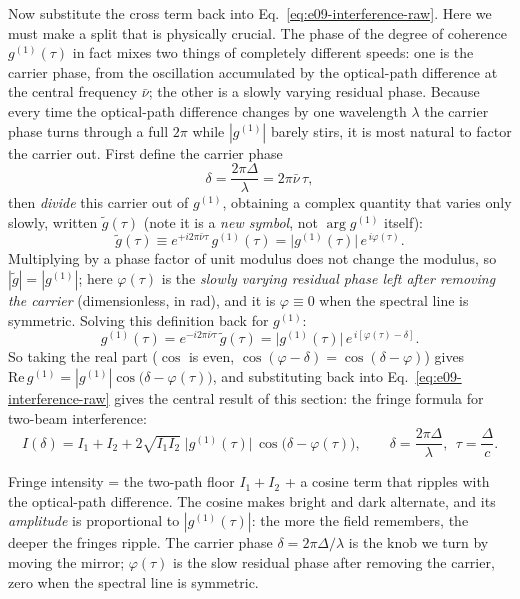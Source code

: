 Now substitute the cross term back into Eq.~\eqref{eq:e09-interference-raw}. Here we must make a split that is physically crucial. The phase of the degree of coherence \(g^{(1)}(\tau)\) in fact mixes two things of completely different speeds: one is the carrier phase, from the oscillation accumulated by the optical-path difference at the central frequency \(\bar\nu\); the other is a slowly varying residual phase. Because every time the optical-path difference changes by one wavelength \(\lambda\) the carrier phase turns through a full \(2\pi\) while \(|g^{(1)}|\) barely stirs, it is most natural to factor the carrier out. First define the carrier phase
\[
  \delta=\frac{2\pi\Delta}{\lambda}=2\pi\bar\nu\,\tau ,
\]
then \emph{divide} this carrier out of \(g^{(1)}\), obtaining a complex quantity that varies only slowly, written \(\tilde g(\tau)\) (note it is a \emph{new symbol}, not \(\arg g^{(1)}\) itself):
\[
  \tilde g(\tau)\equiv e^{+i2\pi\bar\nu\tau}\,g^{(1)}(\tau)
  =\big|g^{(1)}(\tau)\big|\,e^{\,i\varphi(\tau)} .
\]
Multiplying by a phase factor of unit modulus does not change the modulus, so \(|\tilde g|=|g^{(1)}|\); here \(\varphi(\tau)\) is the \emph{slowly varying residual phase left after removing the carrier} (dimensionless, in rad), and it is \(\varphi\equiv0\) when the spectral line is symmetric. Solving this definition back for \(g^{(1)}\):
\[
  g^{(1)}(\tau)=e^{-i2\pi\bar\nu\tau}\,\tilde g(\tau)
  =\big|g^{(1)}(\tau)\big|\,e^{\,i[\varphi(\tau)-\delta]} .
\]
So taking the real part (\(\cos\) is even, \(\cos(\varphi-\delta)=\cos(\delta-\varphi)\)) gives \(\mathrm{Re}\,g^{(1)}=|g^{(1)}|\cos\!\big(\delta-\varphi(\tau)\big)\), and substituting back into Eq.~\eqref{eq:e09-interference-raw} gives the central result of this section: the fringe formula for two-beam interference:
\begin{equation}
  I(\delta)=I_1+I_2+2\sqrt{I_1 I_2}\;\big|g^{(1)}(\tau)\big|\,
  \cos\!\big(\delta-\varphi(\tau)\big),
  \qquad \delta=\frac{2\pi\Delta}{\lambda},\ \ \tau=\frac{\Delta}{c}.
  \label{eq:e09-fringe}
\end{equation}
\begin{formulaexplain}
Fringe intensity = the two-path floor \(I_1+I_2\) + a cosine term that ripples with the optical-path difference. The cosine makes bright and dark alternate, and its \emph{amplitude} is proportional to \(|g^{(1)}(\tau)|\): the more the field remembers, the deeper the fringes ripple. The carrier phase \(\delta=2\pi\Delta/\lambda\) is the knob we turn by moving the mirror; \(\varphi(\tau)\) is the slow residual phase after removing the carrier, zero when the spectral line is symmetric.
\end{formulaexplain}

